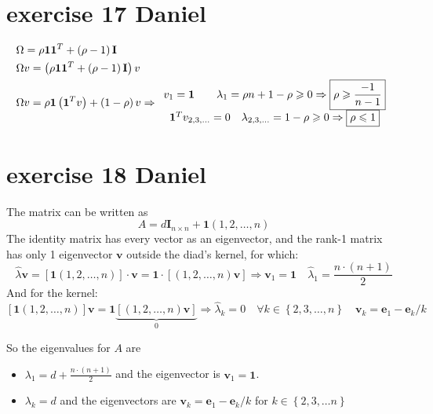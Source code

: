 \documentclass{article}
\begin{document}
\section{exercise 17 Daniel}
\[\begin{gathered}
        \Omega  = \rho {\mathbf{1}}{{\mathbf{1}}^T} + \left( {\rho  - 1} \right){\mathbf{I}} \hfill \\
        \Omega v = \left( {\rho {\mathbf{1}}{{\mathbf{1}}^T} + \left( {\rho  - 1} \right){\mathbf{I}}} \right)v \hfill \\
        \Omega v = \rho {\mathbf{1}}\left( {{{\mathbf{1}}^T}v} \right) + \left( {1 - \rho } \right)v \Rightarrow \begin{array}{*{20}{c}}
            {{v_1} = {\mathbf{1}}\qquad {\lambda _1} = \rho n + 1 - \rho  \geqslant 0 \Rightarrow \boxed{\rho  \geqslant \frac{{ - 1}}{{n - 1}}}} \\
            {{\mathbf{1}^T}{v_{2,3, \ldots }} = 0\quad {\lambda _{2,3, \ldots }} = 1 - \rho  \geqslant 0 \Rightarrow \boxed{\rho  \leqslant 1}}
        \end{array} \hfill \\
    \end{gathered} \]

\section{exercise 18 Daniel}
The matrix can be written as
\[A= d{{\mathbf{I}}_{n \times n}} + {\mathbf{1}} \left( {1,2, \ldots ,n} \right)\]
The identity matrix has every vector as an eigenvector, and the rank-1 matrix has only 1 eigenvector $\mathbf{v}$ outside the diad's kernel, for which:
\[
    \hat\lambda \mathbf{v} = \left[{\mathbf{1}} \left( {1,2, \ldots ,n} \right) \right] \cdot \mathbf{v} = {\mathbf{1}} \cdot \left[ \left( {1,2, \ldots ,n} \right) \mathbf{v}\right] \Rightarrow \mathbf{v}_1 = \mathbf{1} \quad \hat\lambda_1 = \frac{n \cdot (n+1)}{2}
\]
And for the kernel:
\[\left[ {{\mathbf{1}}\left( {1,2, \ldots ,n} \right)} \right]{\mathbf{v}} = {\mathbf{1}}\underbrace {\left[ {\left( {1,2, \ldots ,n} \right){\mathbf{v}}} \right]}_0 \Rightarrow \hat\lambda _k = 0\quad \forall k \in \left\{ {2,3, \ldots ,n} \right\}\quad {{\mathbf{v}}_k} = {{\mathbf{e}}_1} - {{\mathbf{e}}_k}/k\]

So the eigenvalues for $A$ are
\begin{itemize}
    \item $\lambda_1 = d + \frac{n \cdot (n+1)}{2}$ and the eigenvector is $\mathbf{v}_1 = \mathbf{1}$.
    \item $\lambda_k = d$ and the eigenvectors are $\mathbf{v}_k = {\mathbf{e}}_1 - {{\mathbf{e}}_k}/k$ for $k \in \left\{2, 3, \ldots n\right\}$
\end{itemize}
\end{document}
